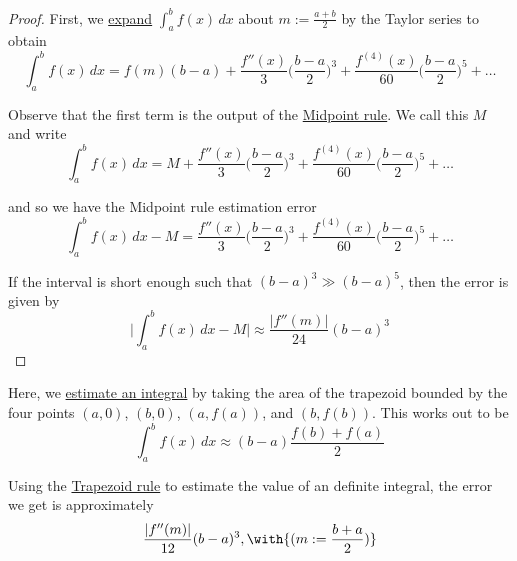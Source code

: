 \begin{proof}
  First, we \href{b024138}{expand} $\int_a^bf(x)\,dx$ about $m:=\frac{a+b}2$ by
  the Taylor series to obtain
  $$
    \int_a^bf(x)\,dx=f(m)(b-a)+\frac{f''(x)}3\biggl(\frac{b-a}2\biggr)^3+\frac{f^{(4)}(x)}{60}\biggl(\frac{b-a}2\biggr)^5+\ldots
  $$

  Observe that the first term is the output of the \href{adcfc4b}{Midpoint
  rule}. We call this $M$ and write
  $$
    \int_a^bf(x)\,dx=M+\frac{f''(x)}3\biggl(\frac{b-a}2\biggr)^3+\frac{f^{(4)}(x)}{60}\biggl(\frac{b-a}2\biggr)^5+\ldots
  $$

  and so we have the Midpoint rule estimation error
  $$
    \int_a^bf(x)\,dx-M=\frac{f''(x)}3\biggl(\frac{b-a}2\biggr)^3+\frac{f^{(4)}(x)}{60}\biggl(\frac{b-a}2\biggr)^5+\ldots
  $$

  If the interval is short enough such that $(b-a)^3\gg(b-a)^5$, then the error
  is given by
  $$
    \biggl|\int_a^bf(x)\,dx-M\biggr|\approx\frac {|f''(m)|}{24}(b-a)^3
  $$
\end{proof}

\label{c0b34f3}

Here, we \href{db6037a}{estimate an integral} by taking the area of the
trapezoid bounded by the four points $(a,0)$, $(b,0)$, $(a,f(a))$, and
$(b,f(b))$. This works out to be
$$
  \int_a^bf(x)\,dx\approx(b-a)\frac{f(b)+f(a)}{2}
$$

\label{cd8528b}

Using the \href{c0b34f3}{Trapezoid rule} to estimate the value of an definite
integral, the error we get is approximately
$$
  \frac{|f''(m)|}{12}(b-a)^3,\with{(m:=\frac{b+a}{2})}
$$

